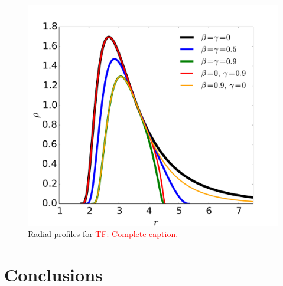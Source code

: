\documentclass{aa}
\newcommand{\tf}[1]{\textcolor{red}{TF: #1}}
\begin{document}
 \begin{figure}[h!]
\centering
\includegraphics[scale=0.25]{figures/fig5.pdf}
\caption{Radial profiles for \tf{Complete caption.}}
           \label{more-profile}%
 \end{figure}

\section{Conclusions}

%
\end{document}
